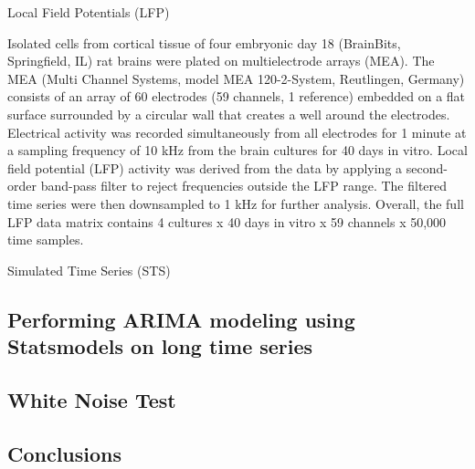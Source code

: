 \documentclass[letterpaper,compsoc,twoside]{IEEEtran}
\begin{document}
Local Field Potentials (LFP)

Isolated cells from cortical tissue of four embryonic day 18 (BrainBits, Springfield, IL) rat brains were plated on multielectrode arrays (MEA). The MEA (Multi Channel Systems, model MEA 120-2-System, Reutlingen, Germany) consists of an array of 60 electrodes (59 channels, 1 reference) embedded on a flat surface surrounded by a circular wall that creates a well around the electrodes. Electrical activity was recorded simultaneously from all electrodes for 1 minute at a sampling frequency of 10 kHz from the brain cultures for 40 days in vitro. Local field potential (LFP) activity was derived from the data by applying a second-order band-pass filter to reject frequencies outside the LFP range. The filtered time series were then downsampled to 1 kHz for further analysis. Overall, the full LFP data matrix contains 4 cultures x 40 days in vitro x 59 channels x 50,000 time samples.

Simulated Time Series (STS)

\subsection{Performing ARIMA modeling using Statsmodels on long time series%
  \label{performing-arima-modeling-using-statsmodels-on-long-time-series}%
}


\subsection{White Noise Test%
  \label{white-noise-test}%
}


\subsection{Conclusions%
  \label{conclusions}%
}

\begin{thebibliography}{ref}
\end{thebibliography}
\end{document}
